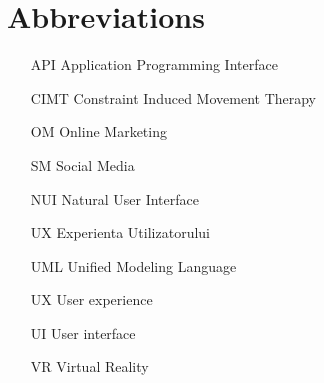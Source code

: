 \section*{Abbreviations}

\begin{itemize}[leftmargin=2cm, topsep=0pt, partopsep=5pt,itemsep=0pt,parsep=0pt]
\item [API] Application Programming Interface
\item [CIMT] Constraint Induced Movement Therapy
\item[OM] Online Marketing
\item[SM] Social Media
\item [NUI] Natural User Interface
\item[UX] Experienta Utilizatorului
\item[UML] Unified Modeling Language
\item[UX] User experience
\item[UI] User interface
\item[VR] Virtual Reality
\end{itemize}